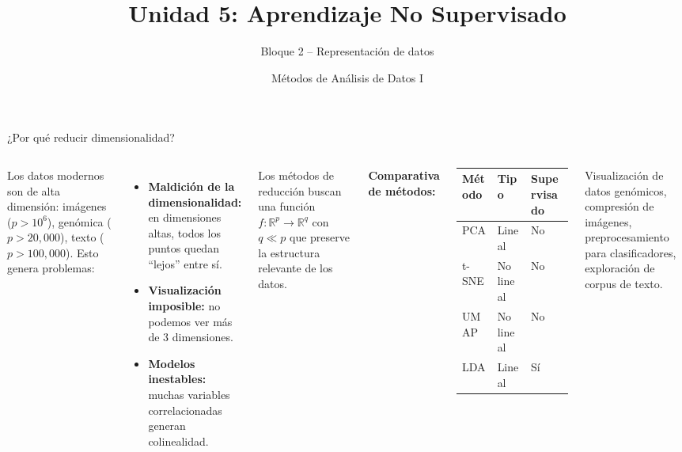 \documentclass[aspectratio=169]{beamer}
\title[Unidad 5 -- Representación]{Unidad 5: Aprendizaje No Supervisado}
\subtitle{Bloque 2 -- Representación de datos}
\author[MAD1 -- UNS]{Métodos de Análisis de Datos I}
\institute{Departamento de Matemática -- Universidad Nacional del Sur}
\date{}
\begin{document}

\begin{frame}
\titlepage
\end{frame}

\begin{frame}{¿Por qué reducir dimensionalidad?}
\begin{columns}[T]
Los datos modernos son de alta dimensión: imágenes ($p > 10^6$), genómica ($p > 20{,}000$), texto ($p > 100{,}000$). Esto genera problemas:

\medskip
\begin{itemize}
  \item \textbf{Maldición de la dimensionalidad:} en dimensiones altas, todos los puntos quedan ``lejos'' entre sí.
  \item \textbf{Visualización imposible:} no podemos ver más de 3 dimensiones.
  \item \textbf{Modelos inestables:} muchas variables correlacionadas generan colinealidad.
\end{itemize}

\medskip
\begin{concepto}
Los métodos de reducción buscan una función $f: \mathbb{R}^p \to \mathbb{R}^q$ con $q \ll p$ que preserve la estructura relevante de los datos.
\end{concepto}

\textbf{Comparativa de métodos:}

\medskip
{\small
\begin{tabular}{lll}
\toprule
\textbf{Método} & \textbf{Tipo} & \textbf{Supervisado} \\
\midrule
PCA   & Lineal    & No \\
t-SNE & No lineal & No \\
UMAP  & No lineal & No \\
LDA   & Lineal    & Sí \\
\bottomrule
\end{tabular}
}

\medskip
\begin{aplicacion}
Visualización de datos genómicos, compresión de imágenes, preprocesamiento para clasificadores, exploración de corpus de texto.
\end{aplicacion}
\end{columns}
\end{frame}
\end{document}
